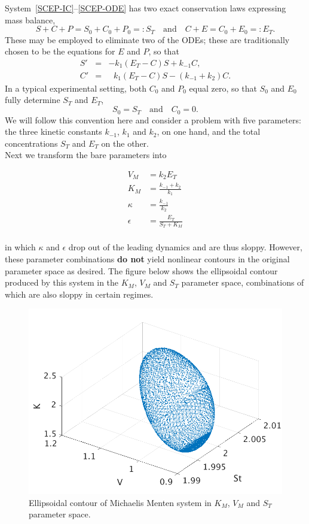 \documentclass[11pt]{article}
\newcommand{\be}{\begin{equation}}
\newcommand{\ee}{\end{equation}}
\begin{document}
System~\eqref{SCEP-IC}--\eqref{SCEP-ODE} has
two exact conservation laws expressing mass balance,
%
\[
 S+C+P = S_0+C_0+P_0 =: S_T
\quad\mbox{and}\quad
 C+E = C_0+E_0 =: E_T .
\]
%
These may be employed to eliminate two of the ODEs;
these are traditionally chosen to be
the equations for $E$ and $P$,
so that
%
\be
\begin{array}{rclcl}
 S' &=& -k_1 (E_T-C) S + k_{-1} C ,
\\
 C' &=& \ \ \, k_1 (E_T-C) S - (k_{-1} + k_2) C .
\end{array}
\label{SC-ODE}
\ee
In a typical experimental setting,
both $C_0$ and $P_0$ equal zero,
so that $S_0$ and $E_0$ fully determine $S_T$ and $E_T$,
%
\be
 S_0 = S_T
\quad\mbox{and}\quad
 C_0 = 0 .
\label{SC-IP}
\ee
%
We will follow this convention here and consider a problem with five
parameters: the three kinetic constants $k_{-1}$, $k_1$ and $k_2$, on
one hand, and the total concentrations $S_T$ and $E_T$ on the other. \\

Next we transform the bare parameters into 

\begin{align*}
  V_M &= k_2 E_T \\
  K_M &= \frac{k_{-1} + k_2}{k_1} \\
  \kappa &= \frac{k_{-1}}{k_2} \\
  \epsilon &= \frac{E_T}{S_T + K_M} \\
\end{align*}

in which $\kappa$ and $\epsilon$ drop out of the leading dynamics and are thus sloppy. However, these parameter combinations \textbf{do not} yield nonlinear contours in the original parameter space as desired. The figure below shows the ellipsoidal contour produced by this system in the $K_M$, $V_M$ and $S_T$ parameter space, combinations of which are also sloppy in certain regimes.

\begin{figure}[htbp]
  \centering
  \includegraphics[width=\linewidth]{k-v-st-contour}
  \caption{Ellipsoidal contour of Michaelis Menten system in $K_M$, $V_M$ and $S_T$ parameter space.}
\end{figure}
\end{document}
